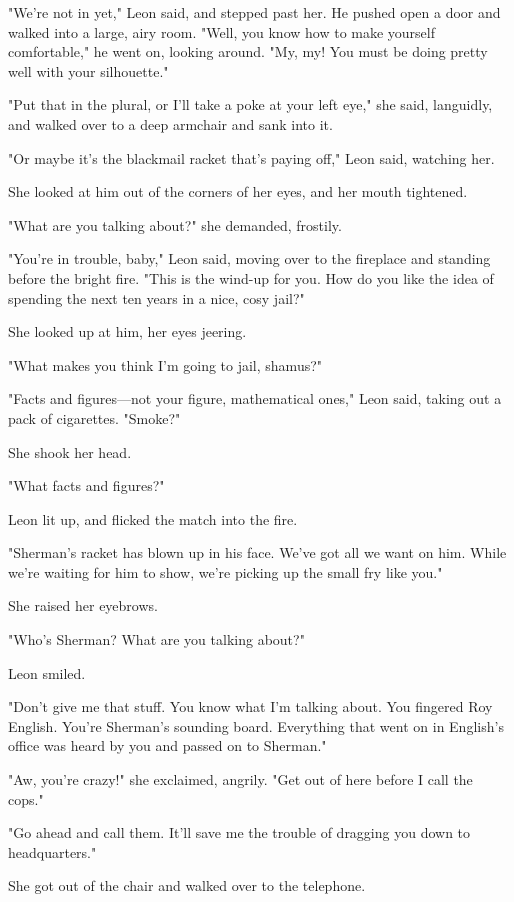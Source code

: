 \documentclass{novel}
\begin{document}
"We're not in yet," Leon said, and stepped past her. He pushed open a door and walked into a large, airy room. "Well, you know how to make yourself comfortable," he went on, looking around. "My, my! You must be doing pretty well with your silhouette."

"Put that in the plural, or I'll take a poke at your left eye," she said, languidly, and walked over to a deep armchair and sank into it.

"Or maybe it's the blackmail racket that's paying off," Leon said, watching her.

She looked at him out of the corners of her eyes, and her mouth tightened.

"What are you talking about?" she demanded, frostily.

"You're in trouble, baby," Leon said, moving over to the fireplace and standing before the bright fire. "This is the wind-up for you. How do you like the idea of spending the next ten years in a nice, cosy jail?"

She looked up at him, her eyes jeering.

"What makes you think I'm going to jail, shamus?"

"Facts and figures—not your figure, mathematical ones," Leon said, taking out a pack of cigarettes. "Smoke?"

She shook her head.

"What facts and figures?"

Leon lit up, and flicked the match into the fire.

"Sherman's racket has blown up in his face. We've got all we want on him. While we're waiting for him to show, we're picking up the small fry like you."

She raised her eyebrows.

"Who's Sherman? What are you talking about?"

Leon smiled.

"Don't give me that stuff. You know what I'm talking about. You fingered Roy English. You're Sherman's sounding board. Everything that went on in English's office was heard by you and passed on to Sherman."

"Aw, you're crazy!" she exclaimed, angrily. "Get out of here before I call the cops."

"Go ahead and call them. It'll save me the trouble of dragging you down to headquarters."

She got out of the chair and walked over to the telephone.
\end{document}
